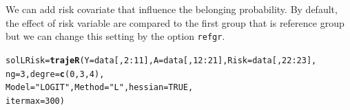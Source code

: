 \documentclass{article}\usepackage[]{graphicx}\usepackage[]{color}
\makeatletter
\newcommand{\hlnum}[1]{\textcolor[rgb]{0.686,0.059,0.569}{#1}}%
\newcommand{\hlstr}[1]{\textcolor[rgb]{0.192,0.494,0.8}{#1}}%
\newcommand{\hlopt}[1]{\textcolor[rgb]{0,0,0}{#1}}%
\newcommand{\hlstd}[1]{\textcolor[rgb]{0.345,0.345,0.345}{#1}}%
\newcommand{\hlkwb}[1]{\textcolor[rgb]{0.69,0.353,0.396}{#1}}%
\newcommand{\hlkwc}[1]{\textcolor[rgb]{0.333,0.667,0.333}{#1}}%
\newcommand{\hlkwd}[1]{\textcolor[rgb]{0.737,0.353,0.396}{\textbf{#1}}}%
\newenvironment{kframe}{%
 \def\at@end@of@kframe{}%
 \ifinner\ifhmode%
  \def\at@end@of@kframe{\end{minipage}}%
  \begin{minipage}{\columnwidth}%
 \fi\fi%
 \def\FrameCommand##1{\hskip\@totalleftmargin \hskip-\fboxsep
 \colorbox{shadecolor}{##1}\hskip-\fboxsep
     \hskip-\linewidth \hskip-\@totalleftmargin \hskip\columnwidth}%
 \MakeFramed {\advance\hsize-\width
   \@totalleftmargin\z@ \linewidth\hsize
   \@setminipage}}%
 {\par\unskip\endMakeFramed%
 \at@end@of@kframe}
\newenvironment{knitrout}{}{} %
\makeatother
\begin{document}
We can add risk covariate that influence the belonging probability. By default, the effect of risk variable are compared to the first group that is reference group but we can change this setting by the option \verb|refgr|.
\begin{knitrout}
\color{fgcolor}\begin{kframe}
\begin{alltt}
\hlstd{solLRisk} \hlkwb{=} \hlkwd{trajeR}\hlstd{(}\hlkwc{Y} \hlstd{= data[,}\hlnum{2}\hlopt{:}\hlnum{11}\hlstd{],} \hlkwc{A} \hlstd{= data[,}\hlnum{12}\hlopt{:}\hlnum{21}\hlstd{],} \hlkwc{Risk} \hlstd{= data[,}\hlnum{22}\hlopt{:}\hlnum{23}\hlstd{],}
                  \hlkwc{ng} \hlstd{=} \hlnum{3}\hlstd{,} \hlkwc{degre} \hlstd{=} \hlkwd{c}\hlstd{(}\hlnum{0}\hlstd{,}\hlnum{3}\hlstd{,}\hlnum{4}\hlstd{),}
                  \hlkwc{Model} \hlstd{=} \hlstr{"LOGIT"}\hlstd{,} \hlkwc{Method} \hlstd{=} \hlstr{"L"}\hlstd{,} \hlkwc{hessian} \hlstd{=} \hlnum{TRUE}\hlstd{,}
                  \hlkwc{itermax} \hlstd{=} \hlnum{300}\hlstd{)}
\end{alltt}
\end{kframe}
\end{knitrout}
\end{document}
